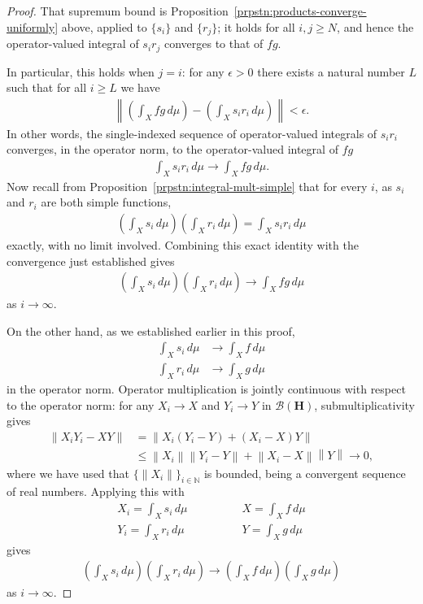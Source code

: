\begin{proof}
That supremum bound is Proposition~\ref{prpstn:products-converge-uniformly} above, applied to $\{s_i\}$ and $\{r_j\}$; it holds for all $i,j \ge N$, and hence the operator-valued integral of $s_i r_j$ converges to that of $fg$.

In particular, this holds when $j = i$: for any $\epsilon > 0$ there exists a natural number $L$ such that for all $i \ge L$ we have
\begin{align}
    \left\| \left( \int_X fg \, d\mu \right) - \left( \int_X s_i r_i \, d\mu \right) \right\| < \epsilon.
\end{align}
In other words, the single-indexed sequence of operator-valued integrals of $s_i r_i$ converges, in the operator norm, to the operator-valued integral of $fg$
\begin{align}
    \int_X s_i r_i \, d\mu \longrightarrow \int_X fg \, d\mu.
\end{align}
Now recall from Proposition~\ref{prpstn:integral-mult-simple} that for every $i$, as $s_i$ and $r_i$ are both simple functions,
\begin{align}
    \left( \int_X s_i \, d\mu \right) \left( \int_X r_i \, d\mu \right) = \int_X s_i r_i \, d\mu
\end{align}
exactly, with no limit involved. Combining this exact identity with the convergence just established gives
\begin{align}
    \left( \int_X s_i \, d\mu \right) \left( \int_X r_i \, d\mu \right) \longrightarrow \int_X fg \, d\mu
\end{align}
as $i \rightarrow \infty$.

On the other hand, as we established earlier in this proof,
\begin{align}
    \int_X s_i \, d\mu &\rightarrow \int_X f \, d\mu \\
    \int_X r_i \, d\mu &\rightarrow \int_X g \, d\mu
\end{align}
in the operator norm. Operator multiplication is jointly continuous with respect to the operator norm: for any $X_i \rightarrow X$ and $Y_i \rightarrow Y$ in $\mathcal{B}(\mathbf{H})$, submultiplicativity gives
\begin{align}
    \left\| X_iY_i - XY \right\| &=   \left\| X_i(Y_i - Y) + (X_i - X)Y \right\| \\
                                 &\le \left\| X_i \right\| \left\| Y_i - Y \right\| + \left\| X_i - X \right\| \left\| Y \right\| \longrightarrow 0,
\end{align}
where we have used that $\{ \|X_i\| \}_{i \in \mathbb{N}}$ is bounded, being a convergent sequence of real numbers. Applying this with
\begin{align}
    X_i = \int_X s_i \, d\mu &\qquad \qquad X   = \int_X f \, d\mu \\
    Y_i = \int_X r_i \, d\mu &\qquad \qquad Y   = \int_X g \, d\mu
\end{align}
gives
\begin{align}
    \left( \int_X s_i \, d\mu \right) \left( \int_X r_i \, d\mu \right) \longrightarrow \left( \int_X f \, d\mu \right) \left( \int_X g \, d\mu \right)
\end{align}
as $i \rightarrow \infty$.


\end{proof}
